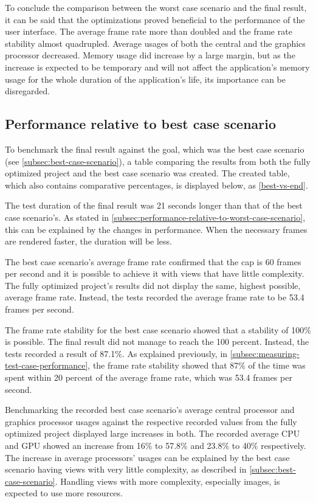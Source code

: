 \documentclass[a4paper,12pt]{article}
\begin{document}
To conclude the comparison between the worst case scenario and the final result, it can be said that the optimizations proved beneficial to the performance of the user interface. The average frame rate more than doubled and the frame rate stability almost quadrupled. Average usages of both the central and the graphics processor decreased. Memory usage did increase by a large margin, but as the increase is expected to be temporary and will not affect the application's memory usage for the whole duration of the application's life, its importance can be disregarded.

\subsection{Performance relative to best case scenario}
\label{subsec:performance-relative-to-best-case-scenario}
To benchmark the final result against the goal, which was the best case scenario (see \autoref{subsec:best-case-scenario}), a table comparing the results from both the fully optimized project and the best case scenario was created. The created table, which also contains comparative percentages, is displayed below, as \autoref{best-vs-end}.

The test duration of the final result was 21 seconds longer than that of the best case scenario's. As stated in \autoref{subsec:performance-relative-to-worst-case-scenario}, this can be explained by the changes in performance. When the necessary frames are rendered faster, the duration will be less.

The best case scenario's average frame rate confirmed that the cap is 60 frames per second and it is possible to achieve it with views that have little complexity. The fully optimized project's results did not display the same, highest possible, average frame rate. Instead, the tests recorded the average frame rate to be 53.4 frames per second.

The frame rate stability for the best case scenario showed that a stability of 100\% is possible. The final result did not manage to reach the 100 percent. Instead, the tests recorded a result of 87.1\%. As explained previously, in \autoref{subsec:measuring-test-case-performance}, the frame rate stability showed that 87\% of the time was spent within 20 percent of the average frame rate, which was 53.4 frames per second.

Benchmarking the recorded best case scenario's average central processor and graphics processor usages against the respective recorded values from the fully optimized project displayed large increases in both. The recorded average CPU and GPU showed an increase from 16\% to 57.8\% and 23.8\% to 40\% respectively. The increase in average processors' usages can be explained by the best case scenario having views with very little complexity, as described in \autoref{subsec:best-case-scenario}. Handling views with more complexity, especially images, is expected to use more resources.
\end{document}
